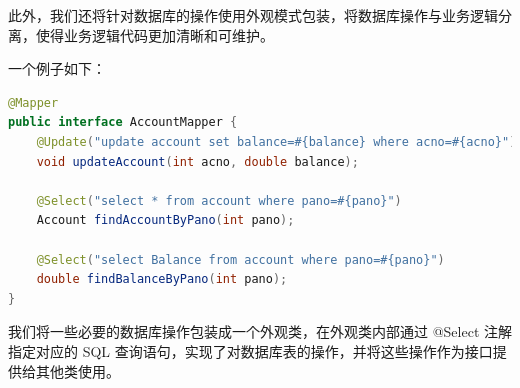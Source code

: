 \documentclass[24pt,a4paper]{article}%
\begin{document}
此外，我们还将针对数据库的操作使用外观模式包装，将数据库操作与业务逻辑分离，使得业务逻辑代码更加清晰和可维护。

一个例子如下：
\begin{lstlisting}[language=Java]
@Mapper
public interface AccountMapper {
    @Update("update account set balance=#{balance} where acno=#{acno}")
    void updateAccount(int acno, double balance);
    
    @Select("select * from account where pano=#{pano}")
    Account findAccountByPano(int pano);
    
    @Select("select Balance from account where pano=#{pano}")
    double findBalanceByPano(int pano);
}
\end{lstlisting}
我们将一些必要的数据库操作包装成一个外观类，在外观类内部通过 @Select 注解指定对应的 SQL 查询语句，实现了对数据库表的操作，并将这些操作作为接口提供给其他类使用。

\newpage
\end{document}
